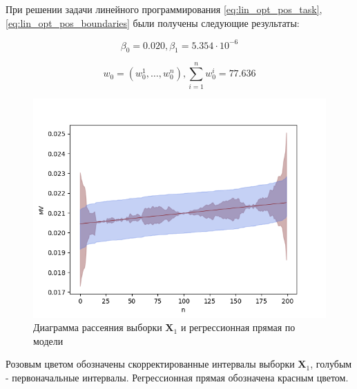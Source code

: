При решении задачи линейного программирования \eqref{eq:lin_opt_pos_task}, \eqref{eq:lin_opt_pos_boundaries} были получены следующие результаты: 

\begin{equation*}
	\beta_0 = 0.020, \beta_1 = 5.354 \cdot 10 ^ {-6} 
\end{equation*}

\begin{equation*}
	w_0 = (w^{1}_0, \ldots, w^{n}_0), \sum\limits_{i=1}^{n} w^{i}_0 = 77.636
\end{equation*}

\begin{figure}[ht]
	\begin{center}
		\includegraphics[scale = 0.55]{../images/diagram_and_regress_0.png}
	\end{center}
	\caption{Диаграмма рассеяния выборки $\bm{X}_1$ и регрессионная прямая по модели} \label{pic:lin_opt_pos_task}
\end{figure}

\FloatBarrier

Розовым цветом обозначены скорректированные интервалы выборки $\bm{X}_1$, голубым - первоначальные интервалы. Регрессионная прямая обозначена красным цветом. 

